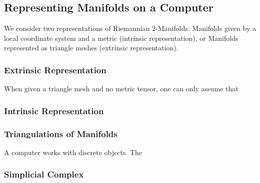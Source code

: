 \subsection{ Representing Manifolds on a Computer}

We consider two representations of Riemannian 2-Manifolds: Manifolds given by a local coordinate system and a metric (intrinsic representation), or Manifolds represented as triangle meshes (extrinsic representation).

\subsubsection{Extrinsic Representation}
When given a triangle mesh and no metric tensor, one can only assume that 

\subsubsection{Intrinsic Representation}

\subsubsection{Triangulations of Manifolds}
A computer works with discrete objects. The 

\subsubsection{Simplicial Complex}


\ifdefined\COMPILINGFROMMAIN
\else    
    
\fi